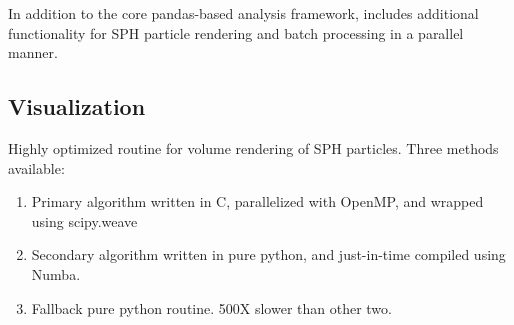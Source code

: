 In addition to the core pandas-based analysis framework,  includes additional functionality for SPH particle rendering and batch processing in a parallel manner.

\subsection{Visualization}
\label{sec:vis}

Highly optimized routine for volume rendering of SPH particles.  Three methods available:
\begin{enumerate}
\item Primary algorithm written in C, parallelized with OpenMP, and wrapped using scipy.weave
\item Secondary algorithm written in pure python, and just-in-time compiled using Numba.
\item Fallback pure python routine.  500X slower than other two.
\end{enumerate}